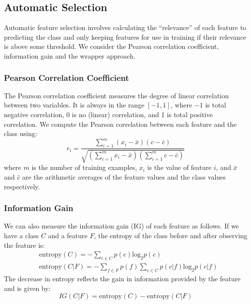 \documentclass{article}
\begin{document}
\subsection{Automatic Selection}
Automatic feature selection involves calculating the ``relevance'' of each
feature to predicting the class and only keeping features for use in training
if their relevance is above some threshold. We consider the Pearson correlation
coefficient, information gain and the wrapper approach.

\subsubsection{Pearson Correlation Coefficient}
The Pearson correlation coefficient measures the degree of linear correlation
between two variables. It is always in the range $[-1,1]$, where $-1$ is total
negative correlation, 0 is no (linear) correlation, and 1 is total positive
correlation. We compute the Pearson correlation between each feature and the
class using:
\begin{equation*}
r_i = \dfrac{\sum_{i=1}^m (x_i-\bar{x})(c-\bar{c})}{\sqrt{(\sum_{i=1}^m x_i-\bar{x})(\sum_{i=1}^m c-\bar{c})}}
\end{equation*}
where $m$ is the number of training examples, $x_i$ is the value of feature
$i$, and $\bar{x}$ and $\bar{c}$ are the arithmetic averages of the feature
values and the class values respectively.

\subsubsection{Information Gain}
We can also measure the information gain (IG) of each feature as follows.
If we have a class $C$ and a feature $F$, the entropy of the
class before and after observing the feature is:
\begin{equation*}
\begin{aligned}
& \mathrm{entropy}(C) = - \sum_{c \in C} p(c) \mathrm{log}_2 p(c) \\
& \mathrm{entropy}(C|F) = - \sum_{f \in F} p(f) \sum_{c \in C} p(c|f) \mathrm{log}_2 p(c|f)
\end{aligned}
\end{equation*}
The decrease in entropy reflects the gain in information provided by the
feature and is given by:
\begin{equation*}
IG(C|F) = \mathrm{entropy}(C) - \mathrm{entropy}(C|F)
\end{equation*}
\end{document}
